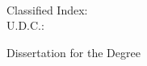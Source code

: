 {\begin{titlepage}

  \ifoneortwoside
    \newpage
    ~~~\vspace{1em}
    \thispagestyle{empty}
  \fi

   \newpage
   \thispagestyle{empty}
   \begin{center}
   \parbox[t][0.6cm][t]{\textwidth}{
   \begin{center} \end{center}}

   \parbox[t][2.2cm][t]{\textwidth}{
   \xiaosi Classified Index: \@natclassifiedindex \\
                 U.D.C.:  \@internatclassifiedindex }

   \parbox[t][2.7cm][b]{\textwidth}{\xiaoer
   \begin{center} {  Dissertation for the {\exueweier} Degree }\end{center} } %


\end{center}
\end{titlepage}}
